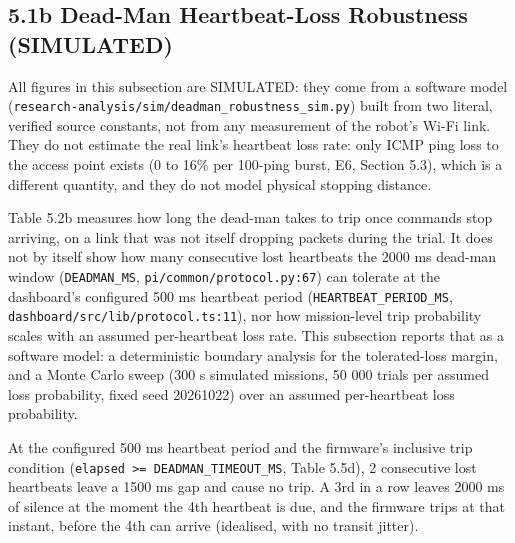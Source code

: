 \subsection*{5.1b Dead-Man Heartbeat-Loss Robustness (SIMULATED)}

All figures in this subsection are SIMULATED: they come from a software model (\texttt{research-analysis/sim/deadman\_robustness\_sim.py}) built from two literal, verified source constants, not from any measurement of the robot's Wi-Fi link. They do not estimate the real link's heartbeat loss rate: only ICMP ping loss to the access point exists (0 to 16\% per 100-ping burst, E6, Section 5.3), which is a different quantity, and they do not model physical stopping distance.

Table 5.2b measures how long the dead-man takes to trip once commands stop arriving, on a link that was not itself dropping packets during the trial. It does not by itself show how many consecutive lost heartbeats the 2000 ms dead-man window (\texttt{DEADMAN\_MS}, \texttt{pi/common/protocol.py:67}) can tolerate at the dashboard's configured 500 ms heartbeat period (\texttt{HEARTBEAT\_PERIOD\_MS}, \texttt{dashboard/src/lib/protocol.ts:11}), nor how mission-level trip probability scales with an assumed per-heartbeat loss rate. This subsection reports that as a software model: a deterministic boundary analysis for the tolerated-loss margin, and a Monte Carlo sweep (300 s simulated missions, 50 000 trials per assumed loss probability, fixed seed 20261022) over an assumed per-heartbeat loss probability.

At the configured 500 ms heartbeat period and the firmware's inclusive trip condition (\texttt{elapsed >= DEADMAN\_TIMEOUT\_MS}, Table 5.5d), 2 consecutive lost heartbeats leave a 1500 ms gap and cause no trip. A 3rd in a row leaves 2000 ms of silence at the moment the 4th heartbeat is due, and the firmware trips at that instant, before the 4th can arrive (idealised, with no transit jitter).


